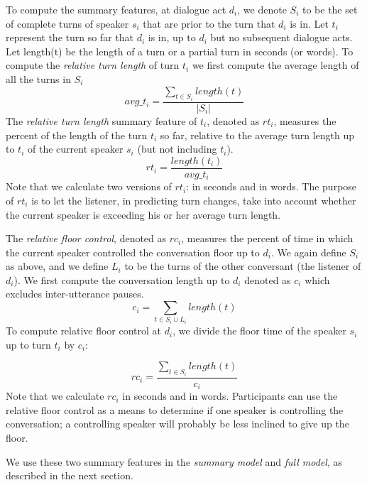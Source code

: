     To compute the summary features, at dialogue act $d_i$, we denote $S_i$ to be the set of complete turns of speaker $s_i$ that are prior to the turn that $d_i$ is in.  Let $t_i$ represent the turn so far that $d_i$ is in, up to $d_i$ but no subsequent dialogue acts.  Let length(t) be the length of a turn or a partial turn in seconds (or words). To compute the \textit{relative turn length} of turn $t_i$ we first compute the average length of all the turns in $S_i$
%
    \begin{equation}
     avg\_t_i = \frac{\sum_{t \in S_i} length(t)}{|S_i|}
     \end{equation}
     The \textit{relative turn length} summary feature of $t_i$, denoted as $rt_i$, measures the percent of the length of the turn $t_i$ so far, relative to the average turn length up to $t_i$ of the current speaker $s_i$ (but not including $t_i$).
%
     \begin{equation}
            rt_i =  \frac{length(t_i)} {avg\_t_i}
     \end{equation}
     Note that we calculate two versions of $rt_i$: in seconds and in words.  The purpose of $rt_i$ is to let the listener, in predicting turn changes, take into account whether the current speaker is exceeding his or her average turn length.

     The \textit{relative floor control}, denoted as $rc_i$, measures the percent of time in which the current speaker controlled the conversation floor up to $d_i$. We again define $S_i$ as above, and we define $L_i$ to be the turns of the other conversant (the listener of $d_i$). We first compute the conversation length up to $d_i$ denoted as $c_i$ which excludes inter-utterance pauses.
     \begin{equation}
         c_i = \sum_{t \in S_i \cup L_i} length(t)
     \end{equation}
     To compute relative floor control at $d_i$, we divide the floor time of the speaker $s_i$ up to turn $t_i$ by $c_i$:

     \begin{equation}
        rc_i = \frac{\sum_{t \in S_i} length(t)} {c_i}
     \end{equation}
     Note that we calculate $rc_i$ in seconds and in words. Participants can use the relative floor control as a means to determine if one speaker is controlling the conversation; a controlling speaker will probably be less inclined to give up the floor.

     We use these two summary features in the \textit{summary model} and \textit{full model}, as described in the next section.


